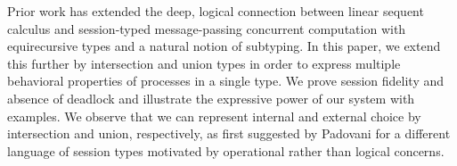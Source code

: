Prior work has extended the deep, logical connection between linear sequent calculus and session-typed message-passing concurrent computation with equirecursive types and a natural notion of subtyping. In this paper, we extend this further by intersection and union types in order to express multiple behavioral properties of processes in a single type. We prove session fidelity and absence of deadlock and illustrate the expressive power of our system with examples. We observe that we can represent internal and external choice by intersection and union, respectively, as first suggested by Padovani for a different language of session types motivated by operational rather than logical concerns.

